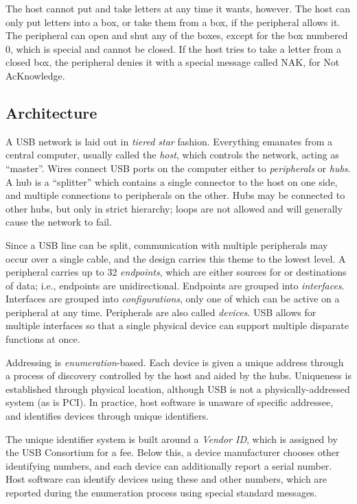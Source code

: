\documentclass[a4paper]{book}
\begin{document}
The host cannot put and take letters at any time it wants, however.  The host can only put letters into a box, or take them from a box, if the peripheral allows it.  The peripheral can open and shut any of the boxes, except for the box numbered 0, which is special and cannot be closed.  If the host tries to take a letter from a closed box, the peripheral denies it with a special message called NAK, for Not AcKnowledge.

\subsection{Architecture}

A USB network is laid out in \emph{tiered star} fashion.  Everything emanates from a central computer, usually called the \emph{host}, which controls the network, acting as ``master''.  Wires connect USB ports on the computer either to \emph{peripherals} or \emph{hubs}.  A hub is a ``splitter'' which contains a single connector to the host on one side, and multiple connections to peripherals on the other.  Hubs may be connected to other hubs, but only in strict hierarchy; loops are not allowed and will generally cause the network to fail.

Since a USB line can be split, communication with multiple peripherals may occur over a single cable, and the design carries this theme to the lowest level.  A peripheral carries up to 32 \emph{endpoints}, which are either sources for or destinations of data; i.e., endpoints are unidirectional.  Endpoints are grouped into \emph{interfaces}.  Interfaces are grouped into \emph{configurations}, only one of which can be active on a peripheral at any time.  Peripherals are also called \emph{devices}.  USB allows for multiple interfaces so that a single physical device can support multiple disparate functions at once.

Addressing is \emph{enumeration}-based.  Each device is given a unique address through a process of discovery controlled by the host and aided by the hubs.  Uniqueness is established through physical location, although USB is not a physically-addressed system (as is PCI).  In practice, host software is unaware of specific addressee, and identifies devices through unique identifiers.

The unique identifier system is built around a \emph{Vendor ID}, which is assigned by the USB Consortium for a fee.  Below this, a device manufacturer chooses other identifying numbers, and each device can additionally report a serial number.  Host software can identify devices using these and other numbers, which are reported during the enumeration process using special standard messages.
\end{document}
